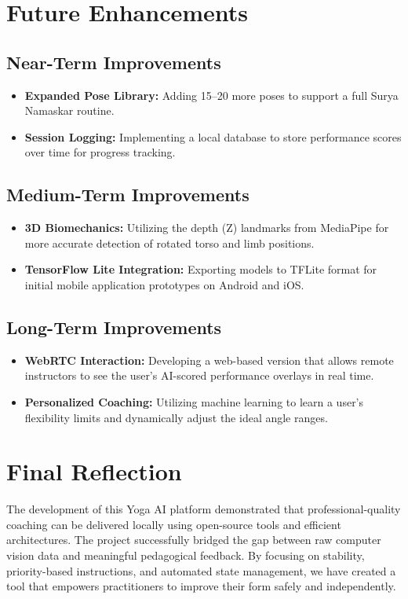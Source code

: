 \section{Future Enhancements}
\subsection{Near-Term Improvements}
\begin{itemize}
    \item \textbf{Expanded Pose Library:} Adding 15--20 more poses to support a full Surya Namaskar routine.
    \item \textbf{Session Logging:} Implementing a local database to store performance scores over time for progress tracking.
\end{itemize}

\subsection{Medium-Term Improvements}
\begin{itemize}
    \item \textbf{3D Biomechanics:} Utilizing the depth (Z) landmarks from MediaPipe for more accurate detection of rotated torso and limb positions.
    \item \textbf{TensorFlow Lite Integration:} Exporting models to TFLite format for initial mobile application prototypes on Android and iOS.
\end{itemize}

\subsection{Long-Term Improvements}
\begin{itemize}
    \item \textbf{WebRTC Interaction:} Developing a web-based version that allows remote instructors to see the user's AI-scored performance overlays in real time.
    \item \textbf{Personalized Coaching:} Utilizing machine learning to learn a user's flexibility limits and dynamically adjust the ideal angle ranges.
\end{itemize}

\section{Final Reflection}
The development of this Yoga AI platform demonstrated that professional-quality coaching can be delivered locally using open-source tools and efficient architectures. The project successfully bridged the gap between raw computer vision data and meaningful pedagogical feedback. By focusing on stability, priority-based instructions, and automated state management, we have created a tool that empowers practitioners to improve their form safely and independently.

